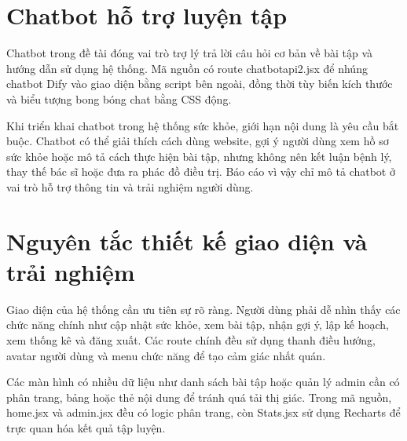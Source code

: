 \section{Chatbot hỗ trợ luyện tập}

Chatbot trong đề tài đóng vai trò trợ lý trả lời câu hỏi cơ bản về bài tập và hướng dẫn sử dụng hệ thống. Mã nguồn có route chatbotapi2.jsx để nhúng chatbot Dify vào giao diện bằng script bên ngoài, đồng thời tùy biến kích thước và biểu tượng bong bóng chat bằng CSS động.


Khi triển khai chatbot trong hệ thống sức khỏe, giới hạn nội dung là yêu cầu bắt buộc. Chatbot có thể giải thích cách dùng website, gợi ý người dùng xem hồ sơ sức khỏe hoặc mô tả cách thực hiện bài tập, nhưng không nên kết luận bệnh lý, thay thế bác sĩ hoặc đưa ra phác đồ điều trị. Báo cáo vì vậy chỉ mô tả chatbot ở vai trò hỗ trợ thông tin và trải nghiệm người dùng.


\section{Nguyên tắc thiết kế giao diện và trải nghiệm}

Giao diện của hệ thống cần ưu tiên sự rõ ràng. Người dùng phải dễ nhìn thấy các chức năng chính như cập nhật sức khỏe, xem bài tập, nhận gợi ý, lập kế hoạch, xem thống kê và đăng xuất. Các route chính đều sử dụng thanh điều hướng, avatar người dùng và menu chức năng để tạo cảm giác nhất quán.


Các màn hình có nhiều dữ liệu như danh sách bài tập hoặc quản lý admin cần có phân trang, bảng hoặc thẻ nội dung để tránh quá tải thị giác. Trong mã nguồn, home.jsx và admin.jsx đều có logic phân trang, còn Stats.jsx sử dụng Recharts để trực quan hóa kết quả tập luyện.


